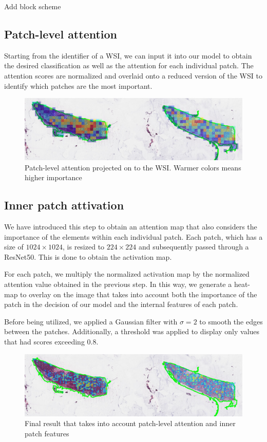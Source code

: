 \documentclass{article}
\begin{document}
Add block scheme

\subsection{Patch-level attention}

Starting from the identifier of a WSI, we can input it into our model to obtain the desired classification as well as the attention for each individual patch. The attention scores are normalized and overlaid onto a reduced version of the WSI to identify which patches are the most important.

\begin{figure}[h]
	\centering
	\includegraphics[width=1\textwidth]{images/old_attention_map_val.png}
	\caption{Patch-level attention projected on to the WSI. Warmer colors means higher importance}
\end{figure}


\subsection{Inner patch attivation}
We have introduced this step to obtain an attention map that also considers the importance of the elements within each individual patch. Each patch, which has a size of $1024\times1024$, is resized to $224\times224$ and subsequently passed through a ResNet50. This is done to obtain the activation map.

For each patch, we multiply the normalized activation map by the normalized attention value obtained in the previous step. In this way, we generate a heat-map to overlay on the image that takes into account both the importance of the patch in the decision of our model and the internal features of each patch.

Before being utilized, we applied a Gaussian filter with $\sigma =2$ to smooth the edges between the patches. Additionally, a threshold was applied to display only values that had scores exceeding $0.8$.
 
\begin{figure}[h]
	\centering
	\includegraphics[width=1\textwidth]{images/attention_map_val.png}
	\caption{Final result that takes into account patch-level attention and inner patch features}
\end{figure}

\newpage
\end{document}
